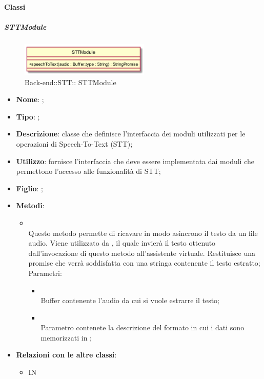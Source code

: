 \paragraph{Classi}
\hypertarget{STTModule_label}{\subparagraph{ STTModule}}
\begin{figure}[h]
	\centering
	\includegraphics[width=0.55\textwidth,height=\textheight,keepaspectratio]{images/ClassSTTModule.png}
	\caption{Back-end::STT:: STTModule}
\end{figure}
\begin{itemize}
	\item \textbf{Nome}: ;
	\item \textbf{Tipo}: ;
	\item \textbf{Descrizione}: classe che definisce l'interfaccia dei moduli utilizzati per le operazioni di Speech-To-Text (STT);
	\item \textbf{Utilizzo}: fornisce l'interfaccia che deve essere implementata dai moduli che permettono l'accesso alle funzionalità di STT;
	\item \textbf{Figlio}: ;
	\item \textbf{Metodi}:
	\begin{itemize}
		\item[]  \\		Questo metodo permette di ricavare in modo asincrono il testo da un file audio. Viene utilizzato da , il quale invierà il testo ottenuto dall'invocazione di questo metodo all'assistente virtuale. Restituisce una promise che verrà soddisfatta con una stringa contenente il testo estratto;\\
		Parametri:
		\begin{itemize}
			\item {} \\
			Buffer contenente l'audio da cui si vuole estrarre il testo;
			\item {} \\
			Parametro contenete la descrizione del formato in cui i dati sono memorizzati in ;
		\end{itemize}
	\end{itemize}
	\item \textbf{Relazioni con le altre classi}:
	\begin{itemize}
		\item IN \hyperlink{VocalAPI_label}{}
	\end{itemize}
\end{itemize}
\FloatBarrier


